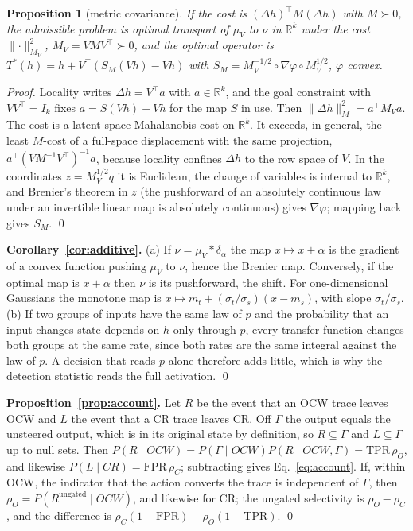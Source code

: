 \documentclass{article}
\newtheorem{proposition}{Proposition}
\newcommand{\ocw}{OCW}
\newcommand{\crok}{CR}
\begin{document}
\begin{proposition}[metric covariance]
\label{prop:metric}
If the cost is $(\Delta h)^\top M(\Delta h)$ with $M\succ0$, the admissible
problem is optimal transport of $\mu_V$ to $\nu$ in $\mathbb{R}^k$ under the
cost $\lVert\cdot\rVert^2_{M_V}$, $M_V=VMV^\top\succ0$, and the optimal
operator is $T^*(h)=h+V^\top(S_M(Vh)-Vh)$ with
$S_M=M_V^{-1/2}\circ\nabla\varphi\circ M_V^{1/2}$, $\varphi$ convex.
\end{proposition}

\emph{Proof.} Locality writes $\Delta h=V^\top a$ with $a\in\mathbb{R}^k$, and
the goal constraint with $VV^\top=I_k$ fixes $a=S(Vh)-Vh$ for the map $S$ in
use. Then $\lVert\Delta h\rVert_M^2=a^\top M_Va$. The cost is a latent-space
Mahalanobis cost on $\mathbb{R}^k$. It exceeds, in general, the least
$M$-cost of a full-space displacement with the same projection,
$a^\top(VM^{-1}V^\top)^{-1}a$, because locality confines $\Delta h$ to the row
space of $V$. In the coordinates
$z=M_V^{1/2}q$ it is Euclidean, the change of variables is internal to
$\mathbb{R}^k$, and Brenier's theorem in $z$ (the pushforward of an absolutely
continuous law under an invertible linear map is absolutely continuous) gives
$\nabla\varphi$; mapping back gives $S_M$. \qed

\textbf{Corollary~\ref{cor:additive}.} (a) If $\nu=\mu_V*\delta_\alpha$ the
map $x\mapsto x+\alpha$ is the gradient of a convex function pushing $\mu_V$
to $\nu$, hence the Brenier map. Conversely, if the optimal map is
$x+\alpha$ then $\nu$ is its pushforward, the shift. For one-dimensional
Gaussians the monotone map is $x\mapsto m_t+(\sigma_t/\sigma_s)(x-m_s)$, with
slope $\sigma_t/\sigma_s$. (b) If two groups of inputs have the same law of $p$
and the probability that an input changes state depends on $h$ only through
$p$, every transfer function changes both groups at the same rate, since both
rates are the same integral against the law of $p$. A decision that reads $p$
alone therefore adds little, which is why the detection statistic reads the
full activation. \qed

\textbf{Proposition~\ref{prop:account}.} Let $R$ be the event that an \ocw{}
trace leaves \ocw{} and $L$ the event that a \crok{} trace leaves \crok{}. Off
$\Gamma$ the output equals the unsteered output, which is in its original state
by definition, so $R\subseteq\Gamma$ and $L\subseteq\Gamma$ up to null sets.
Then $P(R\mid\ocw)=P(\Gamma\mid\ocw)P(R\mid\ocw,\Gamma)=\mathrm{TPR}\,\rho_O$, and
likewise $P(L\mid\crok)=\mathrm{FPR}\,\rho_C$; subtracting gives
Eq.~\eqref{eq:account}. If, within \ocw{}, the indicator that the action
converts the trace is independent of $\Gamma$, then
$\rho_O=P(R^{\mathrm{ungated}}\mid\ocw)$, and likewise for \crok{}; the ungated
selectivity is $\rho_O-\rho_C$, and the difference is
$\rho_C(1-\mathrm{FPR})-\rho_O(1-\mathrm{TPR})$. \qed
\end{document}
